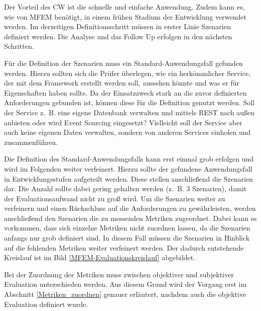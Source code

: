 Der Vorteil des \ac{CW} ist die schnelle und einfache Anwendung. Zudem kann es, wie von \ac{MFEM} benötigt, in einem frühen Stadium der Entwicklung verwendet werden.\cite{Wharton1994} 
Im derzeitigen Definitionsschritt müssen in erster Linie Szenarien definiert werden. Die Analyse und das Follow Up erfolgen in den nächsten Schritten.

\label{Definition_Szenarien}

Für die Definition der Szenarien muss ein Standard-Anwendungsfall gefunden werden. Hierzu sollten sich die Prüfer überlegen, wie ein herkömmlicher Service, der mit dem Framework erstellt werden soll, aussehen könnte und was er für Eigenschaften haben sollte. Da der Einsatzzweck stark an die zuvor definierten Anforderungen gebunden ist, können diese für die Definition genutzt werden. Soll der Service z.~B. eine eigene Datenbank verwalten und mittels \ac{REST} nach außen anbieten oder wird Event Sourcing eingesetzt? Vielleicht soll der Service aber auch keine eigenen Daten verwalten, sondern von anderen Services einholen und zusammenführen.

Die Definition des Standard-Anwendungsfalls kann erst einmal grob erfolgen und wird im Folgenden weiter verfeinert. Hierzu sollte der gefundene Anwendungsfall in Entwicklungsstufen aufgeteilt werden. Diese stellen anschließend die Szenarien dar. Die Anzahl sollte dabei gering gehalten werden (z.~B. 3 Szenarien), damit der Evaluationsaufwand nicht zu groß wird. Um die Szenarien weiter zu verfeinern und einen Rückschluss auf die Anforderungen zu gewährleisten, werden anschließend den Szenarien die zu messenden Metriken zugeordnet. Dabei kann es vorkommen, dass sich einzelne Metriken nicht zuordnen lassen, da die Szenarien anfangs nur grob definiert sind. In diesem Fall müssen die Szenarien in Hinblick auf die fehlenden Metriken weiter verfeinert werden. Der dadurch entstehende Kreislauf ist im Bild \ref{MFEM-Evaluationskreislauf} abgebildet.       


Bei der Zuordnung der Metriken muss zwischen objektiver und subjektiver Evaluation unterschieden werden. Aus diesem Grund wird der Vorgang erst im Abschnitt \ref{Metriken_zuordnen} genauer erläutert, nachdem auch die objektive Evaluation definiert wurde.


